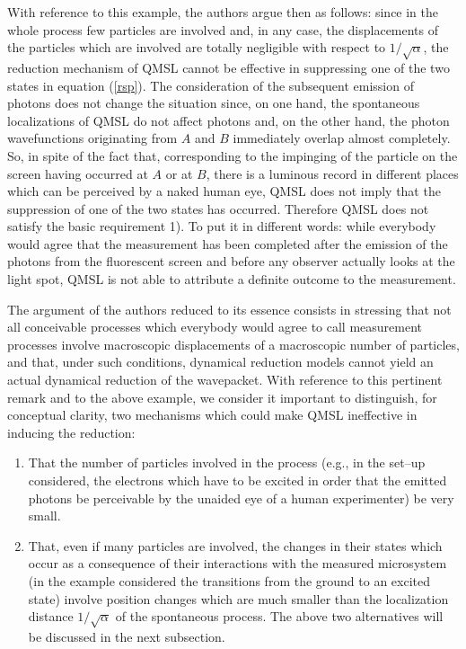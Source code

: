 \documentclass[12pt]{article}
\begin{document}
With reference to this example, the authors argue then as follows:
since in the whole process few particles are involved and, in any
case, the displacements of the particles which are involved are
totally negligible with respect to $1/\sqrt{\alpha}$, the
reduction mechanism of QMSL cannot be effective in suppressing one
of the two states in equation (\ref{rsp}). The consideration of
the subsequent emission of photons does not change the situation
since, on one hand, the spontaneous localizations of QMSL do not
affect photons and, on the other hand, the photon wavefunctions
originating from $A$ and $B$ immediately overlap almost
completely. So, in spite of the fact that, corresponding to the
impinging of the particle on the screen having occurred at $A$ or
at $B$, there is a luminous record in different places which can
be perceived by a naked human eye, QMSL does not imply that the
suppression of one of the two states has occurred. Therefore QMSL
does not satisfy the basic requirement 1). To put it in different
words: while everybody would agree that the measurement has been
completed after the emission of the photons from the fluorescent
screen and before any observer actually looks at the light spot,
QMSL is not able to attribute a definite outcome to the
measurement.

The argument of the authors reduced to its essence consists in
stressing that not all conceivable processes which everybody would
agree to call measurement processes involve macroscopic
displacements of a macroscopic number of particles, and that,
under such conditions, dynamical reduction models cannot yield an
actual dynamical reduction of the wavepacket. With reference to
this pertinent remark and to the above example, we consider it
important to distinguish, for conceptual clarity, two mechanisms
which could make QMSL ineffective in inducing the reduction:
\begin{enumerate}
\item That the number of particles involved in the process (e.g.,
in the set--up considered, the electrons which have to be excited
in order that the emitted photons be perceivable by the unaided
eye of a human experimenter) be very small.

\item That, even if many particles are involved, the changes in
their states which occur as a consequence of their interactions
with the measured microsystem (in the example considered the
transitions from the ground to an excited state) involve position
changes which are much smaller than the localization distance
$1/\sqrt{\alpha}$ of the spontaneous process. The above two
alternatives will be discussed in the next subsection.
\end{enumerate}
\end{document}
